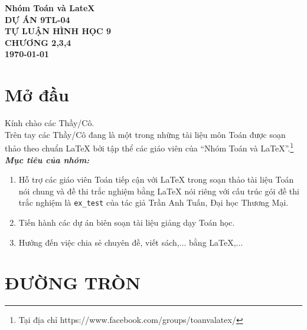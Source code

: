 \documentclass[12pt,a4paper]{book}
\theoremstyle{nonumberplain}
\begin{document}
	\thispagestyle{empty}	
	\begin{tcolorbox}[width=.99\textwidth,height=.99\textheight,arc = 2mm, arc is angular]
		\begin{center}
			{\LARGE \bf \color{red} Nhóm Toán và LateX}\\
			\vspace*{.4cm}
			{\large \bf \color{red} DỰ ÁN 9TL-04}\\	
			\vspace*{9cm}	
			{\bf \fontsize{40}{0}\selectfont T\fontsize{30}{0}\selectfont Ự LUẬN HÌNH HỌC 9\\ CHƯƠNG 2,3,4}\\
			\vspace*{11cm}
			{\large \bf \today}
		\end{center}		
	\end{tcolorbox}
	
	\pagestyle{fancy}
	\chead{\empty}
	\rhead{\currfilename}
	\lfoot{\empty}
	
	\tableofcontents
	
	\chapter*{Mở đầu}
	Kính chào các Thầy/Cô.\\
	\vspace{0.6cm}
	\noindent Trên tay các Thầy/Cô đang là một trong những tài liệu môn Toán được soạn thảo theo chuẩn \LaTeX{} bởi tập thể các giáo viên của ``Nhóm Toán và LaTeX''.\footnote{Tại địa chỉ https://www.facebook.com/groups/toanvalatex/}\\
	\vspace{0.6cm}
	\noindent \textbf{\textit{Mục tiêu của nhóm:}} 
	\begin{enumerate}[\bfseries 1.]
		\item Hỗ trợ các giáo viên Toán tiếp cận với \LaTeX{} trong soạn thảo tài liệu Toán nói chung và đề thi trắc nghiệm bằng \LaTeX{} nói riêng với cấu trúc gói đề thi trắc nghiệm là \texttt{ex\_test} của tác giả Trần Anh Tuấn, Đại học Thương Mại.
		\item Tiến hành các dự án biên soạn tài liệu giảng dạy Toán học.
		\item Hướng đến việc chia sẻ chuyên đề, viết sách,... bằng \LaTeX,...
	\end{enumerate}

\setcounter{chapter}{1}
\chapter{ĐƯỜNG TRÒN}








\end{document}
